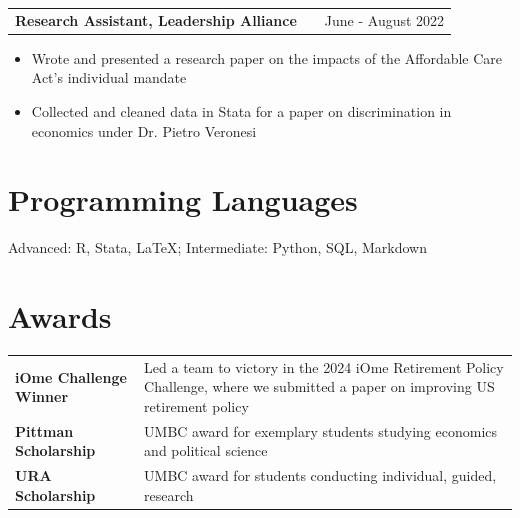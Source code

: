 \documentclass[a4paper,11pt]{article}
\makeatletter
\newenvironment{joblong}[2]
    {
    \begin{tabularx}{\linewidth}{@{}l X r@{}}
    \textbf{#1} & \hfill &  #2 \\[3.75pt]
    \end{tabularx}
    \begin{minipage}[t]{\linewidth}
    \begin{itemize}[nosep,after=\strut, leftmargin=1em, itemsep=3pt,label=--]
    }
    {
    \end{itemize}
    \end{minipage}    
    }
\makeatother
\begin{document}
\begin{joblong}{Research Assistant, Leadership Alliance}{June - August 2022}
\item Wrote and presented a research paper on the impacts of the Affordable Care Act's individual mandate
\item Collected and cleaned data in Stata for a paper on discrimination in economics under Dr. Pietro Veronesi 
\end{joblong}
\section{Programming Languages}
Advanced: R, Stata, LaTeX; Intermediate: Python, SQL, Markdown
\section{Awards}
\begin{tabularx}{\linewidth}{@{}l X@{}}
\textbf{iOme Challenge Winner} &  \normalsize{Led a team to victory in the 2024 iOme Retirement Policy Challenge, where we submitted a paper on improving US retirement policy
}\\ 
\textbf{Pittman Scholarship} &  \normalsize{UMBC award for exemplary students studying economics and political science
}\\ 
\textbf{URA Scholarship} &  \normalsize{UMBC award for students conducting individual, guided, research
}\\
\end{tabularx}
\end{document}
